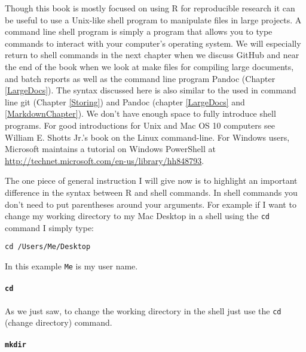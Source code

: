 Though this book is mostly focused on using R for reproducible research it can be useful to use a Unix-like shell program to manipulate files in large projects. A command line shell program is simply a program that allows you to type commands to interact with your computer's operating system. We will especially return to shell commands in the next chapter when we discuss GitHub and near the end of the book when we look at make files for compiling large documents, and batch reports as well as the command line program Pandoc (Chapter \ref{LargeDocs}). The syntax discussed here is also similar to the used in command line git (Chapter \ref{Storing}) and Pandoc (chapter \ref{LargeDocs} and \ref{MarkdownChapter}). We don't have enough space to fully introduce shell programs. For good introductions for Unix and Mac OS 10 computers see William E. Shotts Jr.'s book on the Linux command-line\cite[]{ShottsJr2012}. For Windows users, Microsoft maintains a tutorial on Windows PowerShell at \url{http://technet.microsoft.com/en-us/library/hh848793}.

The one piece of general instruction I will give now is to highlight an important difference in the syntax between R and shell commands. In shell commands you don't need to put parentheses around your arguments. For example if I want to change my working directory to my Mac Desktop in a shell using the {\tt{cd}} command I simply type:

\begin{knitrout}
\color{fgcolor}\begin{kframe}
\begin{verbatim}
cd /Users/Me/Desktop
\end{verbatim}
\end{kframe}
\end{knitrout}


\noindent In this example \texttt{Me} is my user name. 

\paragraph{{\tt{cd}}}

As we just saw, to change the working directory in the shell just use the {\tt{cd}} (change directory) command.

\paragraph{{\tt{mkdir}}}

